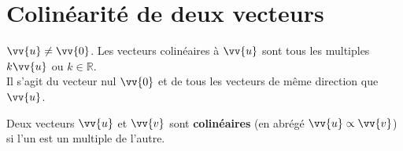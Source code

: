 \documentclass[main.tex]{subfiles}
\begin{document}
%	 

\newpage 
{}  
\pagestyle{scrheadings} %
\onehalfspacing

\section{Colinéarité de deux vecteurs}
\begin{definition}$\vv{u}\neq \vv{0}$.  Les vecteurs colinéaires à $\vv{u}$ sont tous les multiples $k\vv{u}$ ou $k\in\mathbb{R}$.\\
Il s'agit du vecteur nul $\vv{0}$ et de tous les vecteurs de même direction que $\vv{u}$. 
\end{definition} 
\begin{tBox} Deux vecteurs $\vv{u}$ et $\vv{v}$  sont \textbf{colinéaires}\fg{} (en abrégé $\vv{u}\propto\vv{v}$) si l'un est un multiple de l'autre. 
\end{tBox} 
\end{document}
